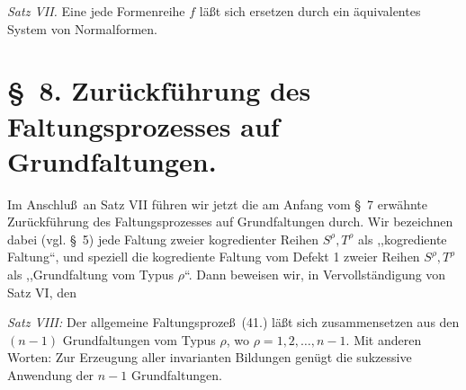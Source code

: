 \documentclass[11pt]{article}
\begin{document}
\emph{Satz VII.} Eine jede Formenreihe $f$ l\"a\ss t sich ersetzen durch ein \"aquivalentes System von Normalformen.

\section*{\S\ 8. Zur\"uckf\"uhrung des Faltungsprozesses auf Grundfaltungen.}
Im Anschlu\ss\ an Satz VII f\"uhren wir jetzt die am Anfang vom \S\ 7 erw\"ahnte Zur\"uckf\"uhrung des Faltungsprozesses auf Grundfaltungen durch. Wir bezeichnen dabei (vgl. \S\ 5) jede Faltung zweier kogredienter Reihen $S^\rho,T^\rho$ als ,,kogrediente Faltung``, und speziell die kogrediente Faltung vom Defekt 1 zweier Reihen $S^\rho,T^\rho$ als ,,Grundfaltung vom Typus $\rho$``. Dann beweisen wir, in Vervollst\"andigung von Satz VI, den

\emph{Satz VIII:} Der allgemeine Faltungsproze\ss\ (41.) l\"a\ss t sich zusammensetzen aus den $(n-1)$ Grundfaltungen vom Typus $\rho$, wo $\rho=1,2,\ldots,n-1$. Mit anderen Worten: Zur Erzeugung aller invarianten Bildungen gen\"ugt die sukzessive Anwendung der $n-1$ Grundfaltungen.
\end{document}
